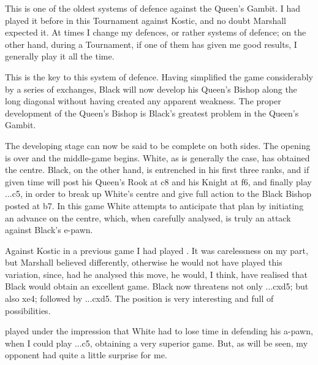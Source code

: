 \documentclass[10pt,twoside]{article}
\begin{document}
This is one of the oldest systems of defence against the Queen's Gambit. I had played it before in this Tournament against Kostic, and no doubt Marshall expected it. At times I change my defences, or rather systems of defence; on the other hand, during a Tournament, if one of them has given me good results, I generally play it all the time.


This is the key to this system of defence. Having simplified the game considerably by a series of exchanges, Black will now develop his Queen's Bishop along the long diagonal without having created any apparent weakness. The proper development of the Queen's Bishop is Black's greatest problem in the Queen's Gambit.


\board

The developing stage can now be said to be complete on both sides. The opening is over and the middle-game begins. White, as is generally the case, has obtained the centre. Black, on the other hand, is entrenched in his first three ranks, and if given time will post his Queen's Rook at c8 and his Knight at f6, and finally play ...c5, in order to break up White's centre and give full action to the Black Bishop posted at b7. In this game White attempts to anticipate that plan by initiating an advance on the centre, which, when carefully analysed, is truly an attack against Black's e-pawn.


Against Kostic in a previous game I had played . It was carelessness on my part, but Marshall believed differently, otherwise he would not have played this variation, since, had he analysed this move, he would, I think, have realised that Black would obtain an excellent game. Black now threatens not only ...cxd5; but also \figN xe4; followed by ...cxd5. The position is very interesting and full of possibilities.

\board


played under the impression that White had to lose time in defending his a-pawn, when I could play ...c5, obtaining a very superior game. But, as will be seen, my opponent had quite a little surprise for me.


\board
\end{document}
